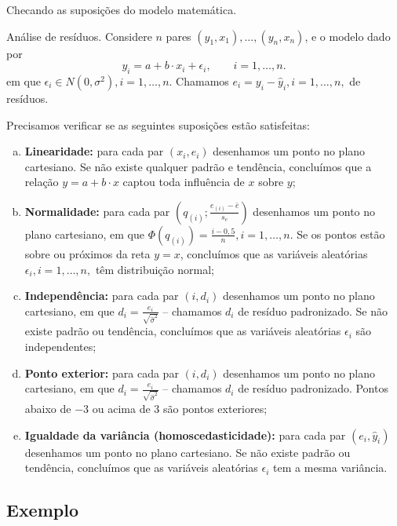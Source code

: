 \documentclass[8pt]{beamer}
\begin{document}
\begin{frame}{Checando as suposições do modelo matemática.}

\small
\begin{block}{Análise de resíduos.}
	Considere $n$ pares $(y_1, x_1), \dots, (y_n, x_n)$, e o modelo dado por
	$$y_i = a + b \cdot x_i + \epsilon_i, \qquad i =1, \dots, n.$$
	em que $\epsilon_i \in N(0, \sigma^2), i =1, \dots, n$. Chamamos $e_i = y_i - \hat{y}_i, i=1, \dots, n,$ de resíduos.

	Precisamos verificar se as seguintes suposições estão satisfeitas:
	\begin{enumerate}[(a)]
		\item \textbf{Linearidade:} para cada par $(x_i, e_i)$ desenhamos um ponto no plano cartesiano. Se não existe qualquer padrão e tendência, concluímos que a relação $y=a+b\cdot x$ captou toda influência de $x$ sobre $y$;
		\item \textbf{Normalidade:} para cada par $\left(q_{(i)}; \frac{e_{(i)} - \bar{e}}{s_e}\right)$ desenhamos um ponto no plano cartesiano, em que $\Phi(q_{(i)})  =\frac{i- 0,5}{n}, i=1, \dots, n$. Se os pontos estão sobre ou próximos da reta $y=x$, concluímos que as variáveis aleatórias $\epsilon_i, i=1, \dots, n,$ têm distribuição normal;
		\item \textbf{Independência:} para cada par $(i, d_i)$ desenhamos um ponto no plano cartesiano, em que $d_i = \frac{e_i}{\sqrt{\hat{\sigma}^2}}$ -- chamamos $d_i$ de resíduo padronizado. Se não existe padrão ou tendência, concluímos que as variáveis aleatórias $\epsilon_i$ são independentes;
		\item \textbf{Ponto exterior:} para cada par $(i, d_i)$ desenhamos um ponto no plano cartesiano, em que $d_i = \frac{e_i}{\sqrt{\hat{\sigma}^2}}$ -- chamamos $d_i$ de resíduo padronizado. Pontos abaixo de $-3$ ou acima de $3$ são pontos exteriores;
		\item \textbf{Igualdade da variância (homoscedasticidade):} para cada par $(e_i, \hat{y}_i)$ desenhamos um ponto no plano cartesiano. Se não existe padrão ou tendência, concluímos que as variáveis aleatórias $\epsilon_i$ tem a mesma variância.
	\end{enumerate}	
\end{block}
\normalsize

\end{frame}

\subsection{Exemplo}
\end{document}
